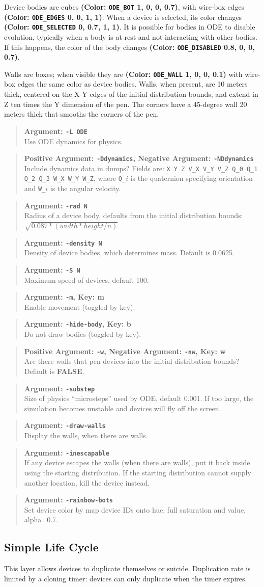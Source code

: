 \documentclass{article}
\newcommand\false{{\bf FALSE}}
\newcommand\var[1]{{\tt #1}}
\newcommand\key[1]{{\bf #1}}
\newcommand\simarg[2]{\begin{quote} {\bf Argument: \var{#1}} \\ #2 \end{quote}}
\newcommand\simargkey[3]{
  \begin{quote} {\bf Argument: \var{#1}, Key: \key{#2}} \\ #3 \end{quote}
}
\newcommand\simPMarg[3]{
  \begin{quote}
    {\bf Positive Argument: \var{#1}, Negative Argument: \var{#2}} \\ #3
  \end{quote}
}
\newcommand\simPMargkey[4]{
  \begin{quote}
    {\bf Positive Argument: \var{#1}, Negative Argument: \var{#2}, 
      Key: \key{#3}} \\ #4
  \end{quote}
}
\newcommand\color[5]{{\bf (Color: {\tt #1} #2, #3, #4, #5)}} %
\begin{document}
Device bodies are cubes \color{ODE\_BOT}{1}{0}{0}{0.7}, with wire-box
edges \color{ODE\_EDGES}{0}{0}{1}{1}.  When a device is selected, its
color changes \color{ODE\_SELECTED}{0}{0.7}{1}{1}.  It is possible for
bodies in ODE to disable evolution, typically when a body is at rest
and not interacting with other bodies.  If this happens, the color of
the body changes \color{ODE\_DISABLED}{0.8}{0}{0}{0.7}.

Walls are boxes; when visible they are
\color{ODE\_WALL}{1}{0}{0}{0.1} with wire-box edges the same color as
device bodies.  Walls, when present, are 10 meters thick, centered on
the X-Y edges of the initial distribution bounds, and extend in Z ten
times the Y dimension of the pen.  The corners have a 45-degree wall
20 meters thick that smooths the corners of the pen.

\simarg{-L ODE}{Use ODE dynamics for physics.}
\simPMarg{-Ddynamics}{-NDdynamics}{Include dynamics data in dumps?
  Fields are: \var{X Y Z V\_X V\_Y V\_Z Q\_0 Q\_1 Q\_2 Q\_3 W\_X W\_Y W\_Z},
  where \var{Q\_$i$} is the quaternion specifying orientation and 
  \var{W\_$i$} is the angular velocity.}
\simarg{-rad N}{Radius of a device body, defaults from the initial
  distribution bounds: $\sqrt{0.087*(width*height/n)}$}
\simarg{-density N}{Density of device bodies, which determines mass.  
  Default is 0.0625.}
\simarg{-S N}{Maximum speed of devices, default 100.}
\simargkey{-m}{m}{Enable movement (toggled by key).}
\simargkey{-hide-body}{b}{Do not draw bodies (toggled by key).}
\simPMargkey{-w}{-nw}{w}{Are there walls that pen devices into
  the initial distribution bounds?  Default is \false{}.}
\simarg{-substep}{Size of physics ``microsteps'' used by ODE, default
  0.001.  If too large, the simulation becomes unstable and devices
  will fly off the screen.}
\simarg{-draw-walls}{Display the walls, when there are walls.}
\simarg{-inescapable}{If any device escapes the walls (when there are
  walls), put it back inside using the starting distribution.  If the
  starting distribution cannot supply another location, kill the
  device instead.}
\simarg{-rainbow-bots}{Set device color by map device IDs onto hue,
  full saturation and value, alpha=0.7.}


\subsection{Simple Life Cycle}

This layer allows devices to duplicate themselves or suicide.
Duplication rate is limited by a cloning timer: devices can only
duplicate when the timer expires.
\end{document}
